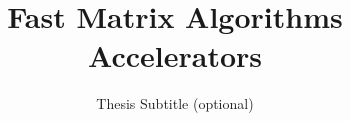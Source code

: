 \documentclass[11pt,a4paper,twocolumn]{report}
\title{Fast Matrix Algorithms Accelerators}
\subtitle{Thesis Subtitle (optional)}
\begin{document}
	\preface
	
	
	
	
	
	

	
	

    \appendix
    \appendixpage
	

%	

	\backcover
\end{document}
